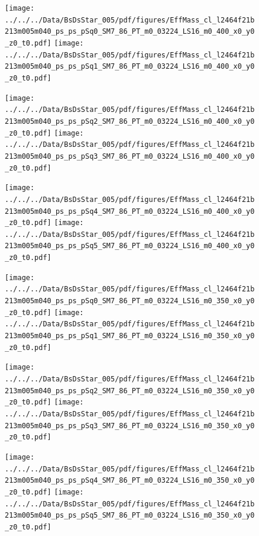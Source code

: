 \documentclass[a4paper,10pt]{article}
\begin{document}
\begin{figure}[p]
 \texttt{[image: ../../../Data/BsDsStar\_005/pdf/figures/EffMass\_cl\_l2464f21b213m005m040\_ps\_ps\_pSq0\_SM7\_86\_PT\_m0\_03224\_LS16\_m0\_400\_x0\_y0\_z0\_t0.pdf]} 
 \texttt{[image: ../../../Data/BsDsStar\_005/pdf/figures/EffMass\_cl\_l2464f21b213m005m040\_ps\_ps\_pSq1\_SM7\_86\_PT\_m0\_03224\_LS16\_m0\_400\_x0\_y0\_z0\_t0.pdf]} 
 \end{figure}
\begin{figure}[p]
 \texttt{[image: ../../../Data/BsDsStar\_005/pdf/figures/EffMass\_cl\_l2464f21b213m005m040\_ps\_ps\_pSq2\_SM7\_86\_PT\_m0\_03224\_LS16\_m0\_400\_x0\_y0\_z0\_t0.pdf]} 
 \texttt{[image: ../../../Data/BsDsStar\_005/pdf/figures/EffMass\_cl\_l2464f21b213m005m040\_ps\_ps\_pSq3\_SM7\_86\_PT\_m0\_03224\_LS16\_m0\_400\_x0\_y0\_z0\_t0.pdf]} 
 \end{figure}
\begin{figure}[p]
 \texttt{[image: ../../../Data/BsDsStar\_005/pdf/figures/EffMass\_cl\_l2464f21b213m005m040\_ps\_ps\_pSq4\_SM7\_86\_PT\_m0\_03224\_LS16\_m0\_400\_x0\_y0\_z0\_t0.pdf]} 
 \texttt{[image: ../../../Data/BsDsStar\_005/pdf/figures/EffMass\_cl\_l2464f21b213m005m040\_ps\_ps\_pSq5\_SM7\_86\_PT\_m0\_03224\_LS16\_m0\_400\_x0\_y0\_z0\_t0.pdf]} 
 \end{figure}
\clearpage
\begin{figure}[p]
 \texttt{[image: ../../../Data/BsDsStar\_005/pdf/figures/EffMass\_cl\_l2464f21b213m005m040\_ps\_ps\_pSq0\_SM7\_86\_PT\_m0\_03224\_LS16\_m0\_350\_x0\_y0\_z0\_t0.pdf]} 
 \texttt{[image: ../../../Data/BsDsStar\_005/pdf/figures/EffMass\_cl\_l2464f21b213m005m040\_ps\_ps\_pSq1\_SM7\_86\_PT\_m0\_03224\_LS16\_m0\_350\_x0\_y0\_z0\_t0.pdf]} 
 \end{figure}
\begin{figure}[p]
 \texttt{[image: ../../../Data/BsDsStar\_005/pdf/figures/EffMass\_cl\_l2464f21b213m005m040\_ps\_ps\_pSq2\_SM7\_86\_PT\_m0\_03224\_LS16\_m0\_350\_x0\_y0\_z0\_t0.pdf]} 
 \texttt{[image: ../../../Data/BsDsStar\_005/pdf/figures/EffMass\_cl\_l2464f21b213m005m040\_ps\_ps\_pSq3\_SM7\_86\_PT\_m0\_03224\_LS16\_m0\_350\_x0\_y0\_z0\_t0.pdf]} 
 \end{figure}
\begin{figure}[p]
 \texttt{[image: ../../../Data/BsDsStar\_005/pdf/figures/EffMass\_cl\_l2464f21b213m005m040\_ps\_ps\_pSq4\_SM7\_86\_PT\_m0\_03224\_LS16\_m0\_350\_x0\_y0\_z0\_t0.pdf]} 
 \texttt{[image: ../../../Data/BsDsStar\_005/pdf/figures/EffMass\_cl\_l2464f21b213m005m040\_ps\_ps\_pSq5\_SM7\_86\_PT\_m0\_03224\_LS16\_m0\_350\_x0\_y0\_z0\_t0.pdf]} 
 \end{figure}
\end{document}
